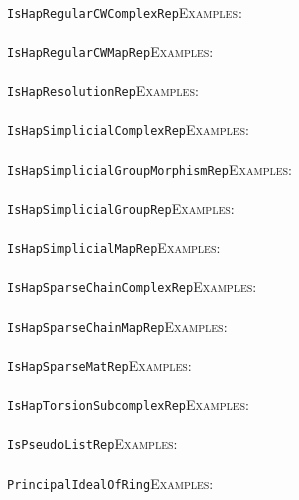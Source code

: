 \documentclass[a4paper,11pt]{report}
\begin{document}
{{ \\
 \texttt{IsHapRegularCWComplexRep}{\nobreakspace}{\nobreakspace}{\nobreakspace}{\nobreakspace}\textsc{Examples:} \\
 \\
 \texttt{IsHapRegularCWMapRep}{\nobreakspace}{\nobreakspace}{\nobreakspace}{\nobreakspace}\textsc{Examples:} \\
 \\
 \texttt{IsHapResolutionRep}{\nobreakspace}{\nobreakspace}{\nobreakspace}{\nobreakspace}\textsc{Examples:} \\
 \\
 \texttt{IsHapSimplicialComplexRep}{\nobreakspace}{\nobreakspace}{\nobreakspace}{\nobreakspace}\textsc{Examples:} \\
 \\
 \texttt{IsHapSimplicialGroupMorphismRep}{\nobreakspace}{\nobreakspace}{\nobreakspace}{\nobreakspace}\textsc{Examples:} \\
 \\
 \texttt{IsHapSimplicialGroupRep}{\nobreakspace}{\nobreakspace}{\nobreakspace}{\nobreakspace}\textsc{Examples:} \\
 \\
 \texttt{IsHapSimplicialMapRep}{\nobreakspace}{\nobreakspace}{\nobreakspace}{\nobreakspace}\textsc{Examples:} \\
 \\
 \texttt{IsHapSparseChainComplexRep}{\nobreakspace}{\nobreakspace}{\nobreakspace}{\nobreakspace}\textsc{Examples:} \\
 \\
 \texttt{IsHapSparseChainMapRep}{\nobreakspace}{\nobreakspace}{\nobreakspace}{\nobreakspace}\textsc{Examples:} \\
 \\
 \texttt{IsHapSparseMatRep}{\nobreakspace}{\nobreakspace}{\nobreakspace}{\nobreakspace}\textsc{Examples:} \\
 \\
 \texttt{IsHapTorsionSubcomplexRep}{\nobreakspace}{\nobreakspace}{\nobreakspace}{\nobreakspace}\textsc{Examples:} \\
 \\
 \texttt{IsPseudoListRep}{\nobreakspace}{\nobreakspace}{\nobreakspace}{\nobreakspace}\textsc{Examples:} \\
 \\
 \texttt{PrincipalIdealOfRing}{\nobreakspace}{\nobreakspace}{\nobreakspace}{\nobreakspace}\textsc{Examples:} \\
 \\
}}
\end{document}
